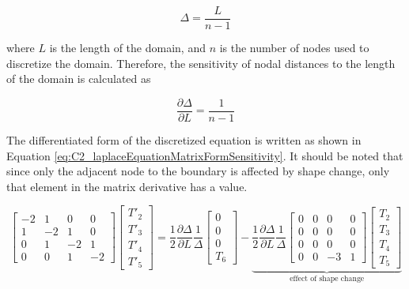 \begin{equation*}
	\Delta = \frac{L}{n - 1}
\end{equation*}

where $L$ is the length of the domain, and $n$ is the number of nodes used to discretize the domain. Therefore, the sensitivity of nodal distances to the length of the domain is calculated as

\begin{equation}\label{eq:C2_nodeDistanceSensitivity}
	\frac{\partial \Delta}{\partial L} = \frac{1}{n-1}
\end{equation}

The differentiated form of the discretized equation is written as shown in Equation \eqref{eq:C2_laplaceEquationMatrixFormSensitivity}. It should be noted that since only the adjacent node to the boundary is affected by shape change, only that element in the matrix derivative has a value.

\begin{equation}\label{eq:C2_laplaceEquationMatrixFormSensitivity}
	\begin{bmatrix}
		-2 & 1 & 0 & 0 \\
		1 & -2 & 1 & 0 \\
		0 & 1 & -2 & 1 \\
		0 & 0 & 1 & -2
	\end{bmatrix}
	\begin{bmatrix}
		T'_2 \\
		T'_3 \\
		T'_4 \\
		T'_5
	\end{bmatrix}
	=
	\frac{1}{2} \frac{\partial \Delta}{\partial L} \frac{1}{\Delta}
	\begin{bmatrix}
		0 \\
		0 \\
		0 \\
		T_6
	\end{bmatrix}
	-
	\underbrace{
	\frac{1}{2} \frac{\partial \Delta}{\partial L} \frac{1}{\Delta}
	\begin{bmatrix}
		0 & 0 & 0 & 0 \\
		0 & 0 & 0 & 0 \\
		0 & 0 & 0 & 0 \\
		0 & 0 & -3 & 1
	\end{bmatrix}
	\begin{bmatrix}
		T_2 \\
		T_3 \\
		T_4 \\
		T_5
	\end{bmatrix}}_\text{effect of shape change}
\end{equation}

